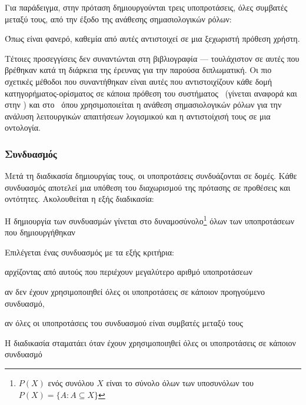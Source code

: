 Για παράδειγμα, στην πρόταση  δημιουργούνται τρεις υποπροτάσεις, όλες συμβατές μεταξύ τους,
από την έξοδο της ανάθεσης σημασιολογικών ρόλων:
\begin{compactenum}
    \item {}
    \item {}
    \item {}
\end{compactenum}
Όπως είναι φανερό, καθεμία από αυτές αντιστοιχεί σε μια ξεχωριστή πρόθεση χρήστη.

Τέτοιες προσεγγίσεις δεν συναντώνται στη βιβλιογραφία --- τουλάχιστον σε αυτές που βρέθηκαν κατά τη διάρκεια της έρευνας για την παρούσα διπλωματική.
Οι πιο σχετικές μέθοδοι που συναντήθηκαν είναι αυτές που αντιστοιχίζουν κάθε δομή κατηγορήματος-ορίσματος σε κάποια πρόθεση του συστήματος~\cite{tur2005semi,hakkani2015clustering}
(γίνεται αναφορά και στην )
και στο~\cite{diamantopoulos2017software} όπου χρησιμοποιείται η ανάθεση σημασιολογικών ρόλων για την ανάλυση λειτουργικών απαιτήσεων λογισμικού και η αντιστοίχισή τους σε μια οντολογία.

\subsubsection{Συνδυασμός}\label{subsec:4-subsentence-combine}
Μετά τη διαδικασία δημιουργίας τους, οι υποπροτάσεις συνδυάζονται σε δομές.
Κάθε συνδυασμός αποτελεί μια υπόθεση του διαχωρισμού της πρότασης σε προθέσεις και οντότητες.
Ακολουθείται η εξής διαδικασία:
\begin{compactenum}
    \item Η δημιουργία των συνδυασμών γίνεται στο δυναμοσύνολο\footnote{ $P(X)$ ενός συνόλου $X$ είναι το σύνολο όλων των υποσυνόλων του $P(X) = \{A: A \subseteq X\}$}
          όλων των υποπροτάσεων που δημιουργήθηκαν
    \item Επιλέγεται ένας συνδυασμός με τα εξής κριτήρια:
          \begin{compactenum}
              \item αρχίζοντας από αυτούς που περιέχουν μεγαλύτερο αριθμό υποπροτάσεων
              \item αν δεν έχουν χρησιμοποιηθεί όλες οι υποπροτάσεις σε κάποιον προηγούμενο συνδυασμό,
              \item αν όλες οι υποπροτάσεις του συνδυασμού είναι συμβατές μεταξύ τους
          \end{compactenum}
    \item Η διαδικασία σταματάει όταν έχουν χρησιμοποιηθεί όλες οι υποπροτάσεις σε κάποιον συνδυασμό
\end{compactenum}


